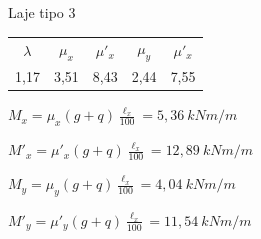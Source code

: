 \begin{resposta}
\begin{enumerate}[start=6]
        

        

        

        Laje tipo 3 \cite[tabela 2.3b]{tabelalajes}

        \begin{table}[h]
            \centering
            \color{gray!80!black}
            \begin{tabular}{c c c c c}
                $\lambda$ & $\mu_x$ & $\mu'_x$ & $\mu_y$ & $\mu'_x$ \\
                1,17 & 3,51 & 8,43 & 2,44 & 7,55
            \end{tabular}
        \end{table}

        $M_x = \mu_x (g+q) \frac{\ell_x}{100} = 5,36 \ kN m/m$

        $M'_x = \mu'_x (g+q) \frac{\ell_x}{100} = 12,89 \ kN m/m$

        $M_y = \mu_y (g+q) \frac{\ell_x}{100} = 4,04 \ kN m/m$

        $M'_y = \mu'_y (g+q) \frac{\ell_x}{100} = 11,54 \ kN m/m$
    \end{enumerate}
\end{resposta}